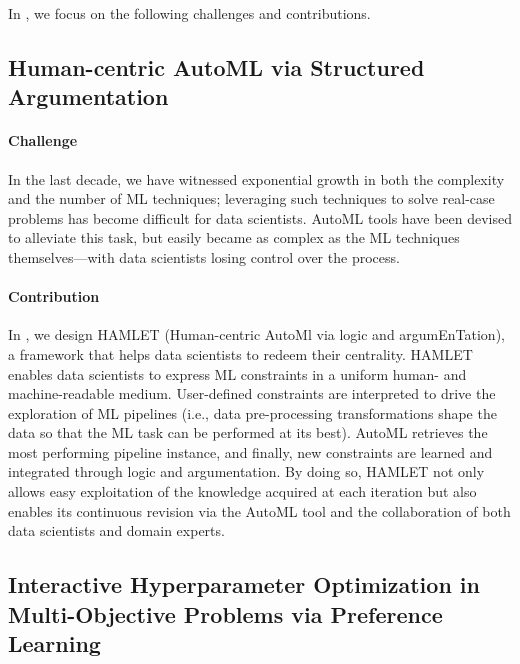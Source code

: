 In , we focus on the following challenges and contributions.

\subsection*{Human-centric AutoML via Structured Argumentation}

\paragraph{Challenge} In the last decade, we have witnessed exponential growth in both the complexity and the number of ML techniques; leveraging such techniques to solve real-case problems has become difficult for data scientists.
AutoML tools have been devised to alleviate this task, but easily became as complex as the ML techniques themselves---with data scientists losing control over the process.

\paragraph{Contribution} In , we design HAMLET (Human-centric AutoMl via logic and argumEnTation), a framework that helps data scientists to redeem their centrality.
HAMLET enables data scientists to express ML constraints in a uniform human- and machine-readable medium.
User-defined constraints are interpreted to drive the exploration of ML pipelines (i.e., data pre-processing transformations shape the data so that the ML task can be performed at its best).
AutoML retrieves the most performing pipeline instance, and finally, new constraints are learned and integrated through logic and argumentation.
By doing so, HAMLET not only allows easy exploitation of the knowledge acquired at each iteration but also enables its continuous revision via the AutoML tool and the collaboration of both data scientists and domain experts.


\subsection*{Interactive Hyperparameter Optimization in Multi-Objective Problems via Preference Learning}


